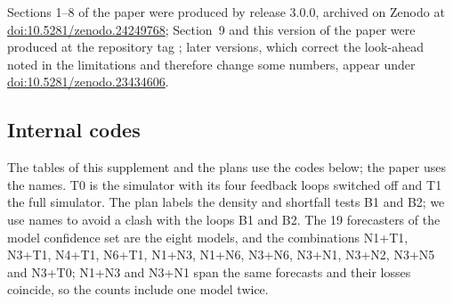 \ifanon\else
Sections 1--8 of the paper were produced by release 3.0.0, archived on Zenodo at \href{https://doi.org/10.5281/zenodo.24249768}{doi:10.5281/zenodo.24249768}; Section~9 and this version of the paper were produced at the repository tag ; later versions, which correct the look-ahead noted in the limitations and therefore change some numbers, appear under \href{https://doi.org/10.5281/zenodo.23434606}{doi:10.5281/zenodo.23434606}.
\fi

\subsection{Internal codes}\label{app:codes}
The tables of this supplement and the plans use the codes below; the paper uses the names. T0 is the simulator with its four feedback loops switched off and T1 the full simulator. The plan labels the density and shortfall tests B1 and B2; we use names to avoid a clash with the loops B1 and B2. The 19 forecasters of the model confidence set are the eight models, and the combinations N1+T1, N3+T1, N4+T1, N6+T1, N1+N3, N1+N6, N3+N6, N3+N1, N3+N2, N3+N5 and N3+T0; N1+N3 and N3+N1 span the same forecasts and their losses coincide, so the counts include one model twice.
